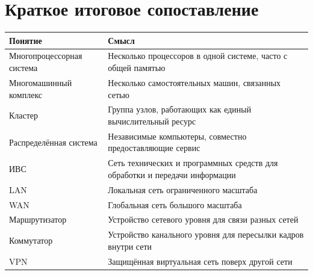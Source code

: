 \documentclass[12pt,a4paper]{article}
\begin{document}
\section{Краткое итоговое сопоставление}

\begin{center}
\begin{tabular}{p{4cm}p{10cm}}
\toprule
Понятие & Смысл \\
\midrule
Многопроцессорная система & Несколько процессоров в одной системе, часто с общей памятью \\
Многомашинный комплекс & Несколько самостоятельных машин, связанных сетью \\
Кластер & Группа узлов, работающих как единый вычислительный ресурс \\
Распределённая система & Независимые компьютеры, совместно предоставляющие сервис \\
ИВС & Сеть технических и программных средств для обработки и передачи информации \\
LAN & Локальная сеть ограниченного масштаба \\
WAN & Глобальная сеть большого масштаба \\
Маршрутизатор & Устройство сетевого уровня для связи разных сетей \\
Коммутатор & Устройство канального уровня для пересылки кадров внутри сети \\
VPN & Защищённая виртуальная сеть поверх другой сети \\
\bottomrule
\end{tabular}
\end{center}
\end{document}
